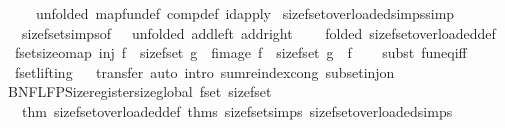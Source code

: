 \begin{isabellebody}
\ \ \ \ unfolded\ map{\isacharunderscore}fun{\isacharunderscore}def\ comp{\isacharunderscore}def\ id{\isacharunderscore}apply{\isacharbrackright}\isanewline
\isanewline
{}\isamarkupfalse%
\ size{\isacharunderscore}fset{\isacharunderscore}overloaded{\isacharunderscore}simps{\isacharbrackleft}simp{\isacharbrackright}\ {\isacharequal}\isanewline
\ \ size{\isacharunderscore}fset{\isacharunderscore}simps{\isacharbrackleft}of\ {\isachardoublequoteopen}{\isasymlambda}{\isacharunderscore}{\isachardot}\ {}{\isachardoublequoteclose}{\isacharcomma}\ unfolded\ add{\isacharunderscore}{}{\isacharunderscore}left\ add{\isacharunderscore}{}{\isacharunderscore}right{\isacharcomma}\isanewline
\ \ \ \ folded\ size{\isacharunderscore}fset{\isacharunderscore}overloaded{\isacharunderscore}def{\isacharbrackright}\isanewline
\isanewline
{}\isamarkupfalse%
\ fset{\isacharunderscore}size{\isacharunderscore}o{\isacharunderscore}map{\isacharcolon}\ {\isachardoublequoteopen}inj\ f\ {\isasymLongrightarrow}\ size{\isacharunderscore}fset\ g\ {\isasymcirc}\ fimage\ f\ {\isacharequal}\ size{\isacharunderscore}fset\ {\isacharparenleft}g\ {\isasymcirc}\ f{\isacharparenright}{\isachardoublequoteclose}\isanewline
%
\isadelimproof
\ \ %
\endisadelimproof
%
\isatagproof
{}\isamarkupfalse%
\ {\isacharparenleft}subst\ fun{\isacharunderscore}eq{\isacharunderscore}iff{\isacharparenright}%
\endisatagproof
{\isafoldproof}%
%
\isadelimproof
\isanewline
%
\endisadelimproof
\ \ \isamarkupfalse%
\ fset{\isachardot}lifting%
\isadelimproof
\ %
\endisadelimproof
%
\isatagproof
{}\isamarkupfalse%
\ transfer\ {\isacharparenleft}auto\ intro{\isacharcolon}\ sum{\isachardot}reindex{\isacharunderscore}cong\ subset{\isacharunderscore}inj{\isacharunderscore}on{\isacharparenright}%
\endisatagproof
{\isafoldproof}%
%
\isadelimproof
%
\endisadelimproof
\isanewline
%
\isadelimML
\isanewline
%
\endisadelimML
%
\isatagML
{}\isamarkupfalse%
\ {\isacartoucheopen}\isanewline
BNF{\isacharunderscore}LFP{\isacharunderscore}Size{\isachardot}register{\isacharunderscore}size{\isacharunderscore}global\ \isactrltypeUNDERSCOREname {\isasymopen}fset{\isasymclose}\ \isactrlconstUNDERSCOREname {\isasymopen}size{\isacharunderscore}fset{\isasymclose}\isanewline
\ \ {\isacharat}{\isacharbraceleft}thm\ size{\isacharunderscore}fset{\isacharunderscore}overloaded{\isacharunderscore}def{\isacharbraceright}\ {\isacharat}{\isacharbraceleft}thms\ size{\isacharunderscore}fset{\isacharunderscore}simps\ size{\isacharunderscore}fset{\isacharunderscore}overloaded{\isacharunderscore}simps{\isacharbraceright}\isanewline

\end{isabellebody}
